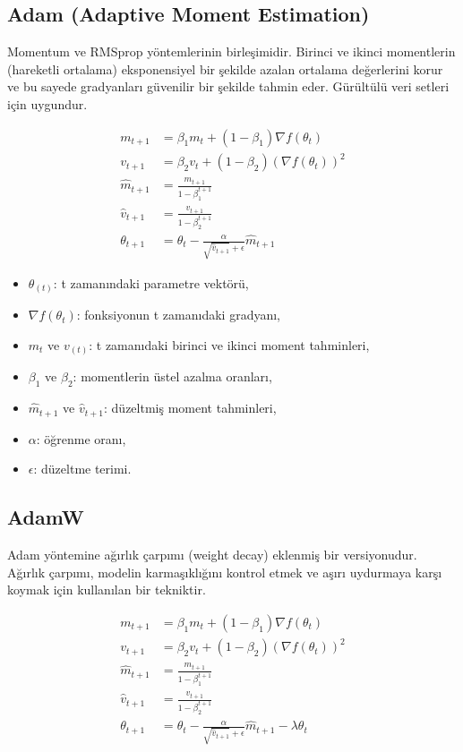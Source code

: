 \newpage

\subsection{Adam (Adaptive Moment Estimation)}
Momentum ve RMSprop yöntemlerinin birleşimidir. Birinci ve ikinci momentlerin (hareketli ortalama) eksponensiyel bir şekilde azalan ortalama değerlerini korur ve bu sayede gradyanları güvenilir bir şekilde tahmin eder. Gürültülü veri setleri için uygundur.

\begin{align*}
m_{t+1} & = \beta_{1}m_{t} + (1 - \beta_{1})\nabla f(\theta_{t}) \\
v_{t+1} & = \beta_{2}v_{t} + (1 - \beta_{2})(\nabla f(\theta_{t}))^2 \\
\hat{m}_{t+1} & = \frac{m_{t+1}}{1 - \beta_{1}^{t+1}} \\
\hat{v}_{t+1} & = \frac{v_{t+1}}{1 - \beta_{2}^{t+1}} \\
\theta_{t+1} & = \theta_{t} - \frac{\alpha}{\sqrt{\hat{v}_{t+1}} + \epsilon} \hat{m}_{t+1}
\end{align*}

\begin{itemize}
	\item $\theta_(t)$: t zamanındaki parametre vektörü,
	\item $\nabla f(\theta_{t})$: fonksiyonun t zamanıdaki gradyanı,
	\item $m_{t}$ ve $v_(t)$: t zamanıdaki birinci ve ikinci moment tahminleri,
	\item $\beta_{1}$ ve $\beta_{2}$: momentlerin üstel azalma oranları,
	\item $\hat{m}_{t+1}$ ve $\hat{v}_{t+1}$: düzeltmiş moment tahminleri,
	\item $\alpha$: öğrenme oranı,
	\item $\epsilon$: düzeltme terimi.
\end{itemize}

\newpage

\subsection{AdamW}
Adam yöntemine ağırlık çarpımı (weight decay) eklenmiş bir versiyonudur. Ağırlık çarpımı, modelin karmaşıklığını kontrol etmek ve aşırı uydurmaya karşı koymak için kullanılan bir tekniktir.

\begin{align*}
m_{t+1} & = \beta_{1}m_{t} + (1 - \beta_{1})\nabla f(\theta_{t}) \\
v_{t+1} & = \beta_{2}v_{t} + (1 - \beta_{2})(\nabla f(\theta_{t}))^2 \\
\hat{m}_{t+1} & = \frac{m_{t+1}}{1 - \beta_{1}^{t+1}} \\
\hat{v}_{t+1} & = \frac{v_{t+1}}{1 - \beta_{2}^{t+1}} \\
\theta_{t+1} & = \theta_{t} - \frac{\alpha}{\sqrt{\hat{v}_{t+1}} + \epsilon} \hat{m}_{t+1} - \lambda \theta_{t}
\end{align*}

